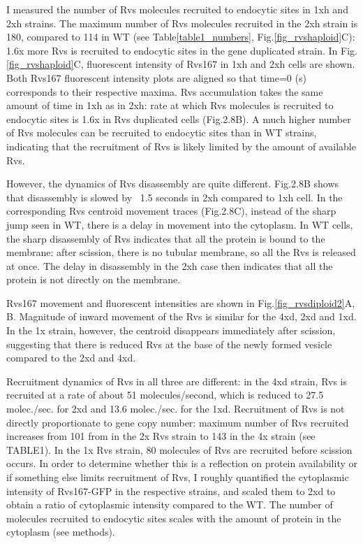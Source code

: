 I measured the number of Rvs molecules recruited to endocytic sites in 1xh and 2xh strains. The maximum number of Rvs molecules recruited in the 2xh strain is 180, compared to 114 in WT (see Table\ref{table1_numbers}, Fig.\ref{fig_rvshaploid}C): 1.6x more Rvs is recruited to endocytic sites in the gene duplicated strain. In Fig.\ref{fig_rvshaploid}C, fluorescent intensity of Rvs167 in 1xh and 2xh cells are shown. Both Rvs167 fluorescent intensity plots are aligned so that time=0 (s) corresponds to their respective maxima. Rvs accumulation takes the same amount of time in 1xh as in 2xh: rate at which Rvs molecules is recruited to endocytic sites is 1.6x in Rvs duplicated cells (Fig.2.8B). A much higher number of Rvs molecules can be recruited to endocytic sites than in WT strains, indicating that the recruitment of Rvs is likely limited by the amount of available Rvs.

However, the dynamics of Rvs disassembly are quite different. Fig.2.8B shows that disassembly is slowed by ~1.5 seconds in 2xh compared to 1xh cell. In the corresponding Rvs centroid movement traces (Fig.2.8C), instead of the sharp jump seen in WT, there is a delay in movement into the cytoplasm. 
In WT cells, the sharp disassembly of Rvs indicates that all the protein is bound to the membrane: after scission, there is no tubular membrane, so all the Rvs is released at once. The delay in disassembly in the 2xh case then indicates that all the protein is not directly on the membrane. 


Rvs167 movement and fluorescent intensities are shown in Fig.\ref{fig_rvsdiploid2}A, B. 
Magnitude of inward movement of the Rvs is similar for the 4xd, 2xd and 1xd. In the 1x strain, however, the centroid disappears immediately after scission, suggesting that there is reduced Rvs at the base of the newly formed vesicle compared to the 2xd and 4xd.

Recruitment dynamics of Rvs in all three are different: in the 4xd strain, Rvs is recruited at a rate of about 51 molecules/second, which is reduced to 27.5 molec./sec. for 2xd and 13.6 molec./sec. for the 1xd. Recruitment of Rvs is not directly proportionate to gene copy number: maximum number of Rvs recruited increases from 101 from in the 2x Rvs strain to 143 in the 4x strain (see TABLE1). In the 1x Rvs strain, 80 molecules of Rvs are recruited before scission occurs. In order to determine whether this is a reflection on protein availability or if something else limits recruitment of Rvs, I roughly quantified the cytoplasmic intensity of Rvs167-GFP in the respective strains, and scaled them to 2xd to obtain a ratio of cytoplasmic intensity compared to the WT. The number of molecules recruited to endocytic sites scales with the amount of protein in the cytoplasm (see methods).  


